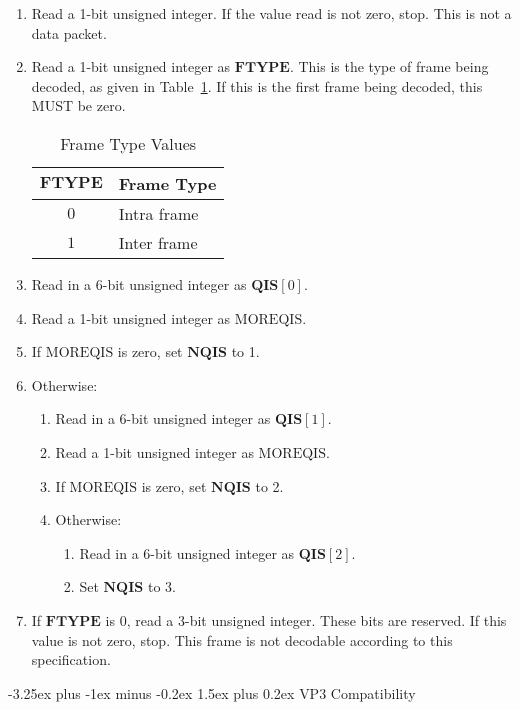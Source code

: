 \documentclass[9pt,letterpaper]{book}
\makeatletter
\newcommand{\bitvar}[1]{\ensuremath{\mathbf{\bm{#1}}}}
\newcommand{\locvar}[1]{\ensuremath{\mathrm{#1}}}
\numberwithin{equation}{chapter}
\numberwithin{figure}{chapter}
\numberwithin{table}{chapter}
\renewcommand{\paragraph}{\@startsection{paragraph}{4}{0ex}%
 {-3.25ex plus -1ex minus -0.2ex}%
 {1.5ex plus 0.2ex}%
 {\normalfont\normalsize\bfseries}}
\makeatother
\begin{document}
\begin{enumerate}
\item
Read a 1-bit unsigned integer.
If the value read is not zero, stop.
This is not a data packet.
\item
Read a 1-bit unsigned integer as \bitvar{FTYPE}.
This is the type of frame being decoded, as given in
 Table~\ref{tab:frame-type}.
If this is the first frame being decoded, this MUST be zero.

\begin{table}[htbp]
\begin{center}
\begin{tabular}{cl}\toprule
\bitvar{FTYPE} & Frame Type  \\\midrule
$0$            & Intra frame \\
$1$            & Inter frame \\
\bottomrule\end{tabular}
\end{center}
\caption{Frame Type Values}
\label{tab:frame-type}
\end{table}

\item
Read in a 6-bit unsigned integer as $\bitvar{QIS}[0]$.
\item
Read a 1-bit unsigned integer as \locvar{MOREQIS}.
\item
If \locvar{MOREQIS} is zero, set \bitvar{NQIS} to 1.
\item
Otherwise:
\begin{enumerate}
\item
Read in a 6-bit unsigned integer as $\bitvar{QIS}[1]$.
\item
Read a 1-bit unsigned integer as \locvar{MOREQIS}.
\item
If \locvar{MOREQIS} is zero, set \bitvar{NQIS} to 2.
\item
Otherwise:
\begin{enumerate}
\item
Read in a 6-bit unsigned integer as $\bitvar{QIS}[2]$.
\item
Set \bitvar{NQIS} to 3.
\end{enumerate}
\end{enumerate}
\item
If \bitvar{FTYPE} is 0, read a 3-bit unsigned integer.
These bits are reserved.
If this value is not zero, stop.
This frame is not decodable according to this specification.
\end{enumerate}

\paragraph{VP3 Compatibility}
\end{document}
